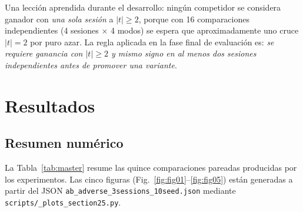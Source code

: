 \documentclass[journal,onecolumn,11pt]{IEEEtran}
\begin{document}
Una lección aprendida durante el desarrollo: ningún competidor se
considera ganador con \emph{una sola sesión} a $|t|\!\geq\!2$, porque
con 16 comparaciones independientes (4 sesiones $\times$ 4 modos)
se espera que aproximadamente uno cruce $|t|=2$ por puro azar. La
regla aplicada en la fase final de evaluación es: \emph{se requiere
ganancia con $|t|\!\geq\!2$ y mismo signo en al menos dos sesiones
independientes antes de promover una variante}.

\section{Resultados}\label{sec:resultados}

\subsection{Resumen numérico}

La Tabla~\ref{tab:master} resume las quince comparaciones pareadas
producidas por los experimentos. Las cinco figuras
(Fig.~\ref{fig:fig01}--\ref{fig:fig05}) están generadas a partir del
JSON \texttt{ab\_adverse\_3sessions\_10seed.json} mediante
\texttt{scripts/\_plots\_section25.py}.
\end{document}
